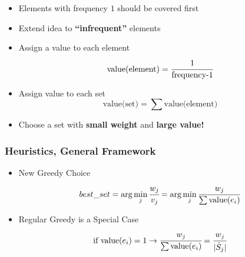 \documentclass[xcolor=dvipsnames]{beamer}
\begin{document}
\begin{frame}
\begin{minipage}{0.70\textwidth}
\begin{itemize}
\item<1-> Elements with frequency $1$ should be covered first
\item<2-> Extend idea to \textbf{``infrequent''} elements
\item<3-> Assign a value to each element
  	$$ \text{value(element)} = \cfrac{1}{\text{frequency-1}}$$
\item<4-> Assign value to each set
	$$ \text{value(set)} = \sum \text{value(element)}$$
\item<5> Choose a set with \textbf{small weight} and \textbf{large value!}
\end{itemize}
\end{minipage}
\end{frame}

\begin{frame}
\frametitle{Heuristics, General Framework}
\begin{minipage}{0.30\textwidth}
\begin{overlayarea}{\textwidth}{0.5\textheight}
% 
\end{overlayarea}%
\end{minipage}%
\begin{minipage}{0.70\textwidth} 
\begin{itemize}
\item<1-> New Greedy Choice 
$$ best\_set = \arg \min_{j} \cfrac{w_j}{v_j} = \arg \min_{j} \cfrac{w_j}{\sum \text{value}(e_i)} $$
\item<2> Regular Greedy is a Special Case
 $$ \text{if value}(e_i) = 1 \rightarrow \cfrac{w_j}{\sum\text{value}(e_i)} = \cfrac{w_j}{|\hat{S}_j|}$$
\end{itemize}
\end{minipage}
\end{frame}
\end{document}
